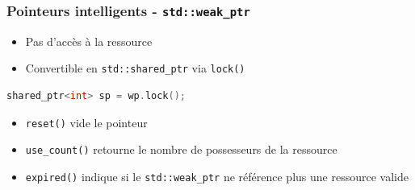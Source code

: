 \documentclass[C++.tex]{subfiles}
\begin{document}
\begin{frame}[fragile]
	\frametitle{Pointeurs intelligents - \lstinline|std::weak_ptr|}
	\begin{itemize}
		\item Pas d'accès à la ressource
		\item Convertible en \lstinline|std::shared_ptr| via \lstinline|lock()|

	\end{itemize}

	\begin{lstlisting}[language=C++]
shared_ptr<int> sp = wp.lock();\end{lstlisting}

	\begin{itemize}
		\item \lstinline|reset()| vide le pointeur
		\item \lstinline|use_count()| retourne le nombre de possesseurs de la ressource


		\item \lstinline|expired()| indique si le \lstinline|std::weak_ptr| ne référence plus une ressource valide

	\end{itemize}
\end{frame}
\end{document}
